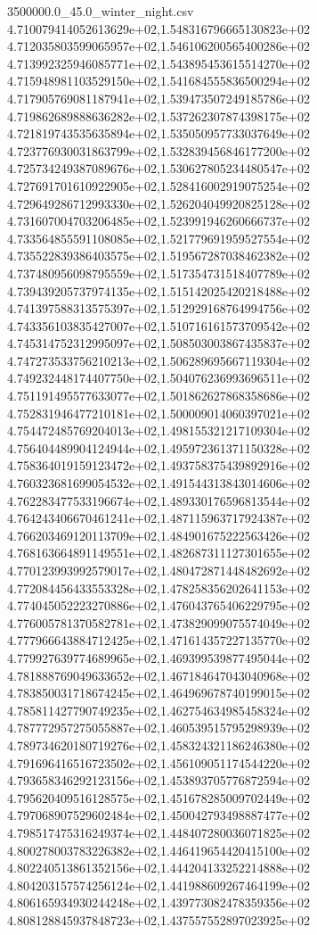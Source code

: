 \begin{filecontents*}{3500000.0_45.0_winter_night.csv}
4.710079414052613629e+02,1.548316796665130823e+02
4.712035803599065957e+02,1.546106200565400286e+02
4.713992325946085771e+02,1.543895453615514270e+02
4.715948981103529150e+02,1.541684555836500294e+02
4.717905769081187941e+02,1.539473507249185786e+02
4.719862689888636282e+02,1.537262307874398175e+02
4.721819743535635894e+02,1.535050957733037649e+02
4.723776930031863799e+02,1.532839456846177200e+02
4.725734249387089676e+02,1.530627805234480547e+02
4.727691701610922905e+02,1.528416002919075254e+02
4.729649286712993330e+02,1.526204049920825128e+02
4.731607004703206485e+02,1.523991946260666737e+02
4.733564855591108085e+02,1.521779691959527554e+02
4.735522839386403575e+02,1.519567287038462382e+02
4.737480956098795559e+02,1.517354731518407789e+02
4.739439205737974135e+02,1.515142025420218488e+02
4.741397588313575397e+02,1.512929168764994756e+02
4.743356103835427007e+02,1.510716161573709542e+02
4.745314752312995097e+02,1.508503003867435837e+02
4.747273533756210213e+02,1.506289695667119304e+02
4.749232448174407750e+02,1.504076236993696511e+02
4.751191495577633077e+02,1.501862627868358686e+02
4.752831946477210181e+02,1.500009014060397021e+02
4.754472485769204013e+02,1.498155321217109304e+02
4.756404489904124944e+02,1.495972361371150328e+02
4.758364019159123472e+02,1.493758375439892916e+02
4.760323681699054532e+02,1.491544313843014606e+02
4.762283477533196674e+02,1.489330176596813544e+02
4.764243406670461241e+02,1.487115963717924387e+02
4.766203469120113709e+02,1.484901675222563426e+02
4.768163664891149551e+02,1.482687311127301655e+02
4.770123993992579017e+02,1.480472871448482692e+02
4.772084456433553328e+02,1.478258356202641153e+02
4.774045052223270886e+02,1.476043765406229795e+02
4.776005781370582781e+02,1.473829099075574049e+02
4.777966643884712425e+02,1.471614357227135770e+02
4.779927639774689965e+02,1.469399539877495044e+02
4.781888769049633652e+02,1.467184647043040968e+02
4.783850031718674245e+02,1.464969678740199015e+02
4.785811427790749235e+02,1.462754634985458324e+02
4.787772957275055887e+02,1.460539515795298939e+02
4.789734620180719276e+02,1.458324321186246380e+02
4.791696416516723502e+02,1.456109051174544220e+02
4.793658346292123156e+02,1.453893705776872594e+02
4.795620409516128575e+02,1.451678285009702449e+02
4.797068907529602484e+02,1.450042793498887477e+02
4.798517475316249374e+02,1.448407280036071825e+02
4.800278003783226382e+02,1.446419654420415100e+02
4.802240513861352156e+02,1.444204133252214888e+02
4.804203157574256124e+02,1.441988609267464199e+02
4.806165934930244248e+02,1.439773082478359356e+02
4.808128845937848723e+02,1.437557552897023925e+02

\end{filecontents*}
